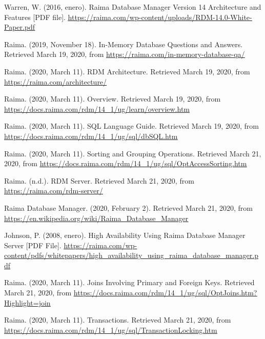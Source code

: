 \documentclass{acmart}
\begin{document}
\begin{thebibliography}{99}
     Warren, W. (2016, enero). Raima Database Manager Version 14 Architecture and Features [PDF file]. \href{https://raima.com/wp-content/uploads/RDM-14.0-White-Paper.pdf}{\ul{https://raima.com/wp-content/uploads/RDM-14.0-White-Paper.pdf}}\par
	 Raima. (2019, November 18). In-Memory Database Questions and Answers. Retrieved March 19, 2020, from \href{https://raima.com/in-memory-database-qa/}{\ul{https://raima.com/in-memory-database-qa/}} \par
	 Raima. (2020, March 11). RDM Architecture. Retrieved March 19, 2020, from \href{https://raima.com/architecture/}{\ul{https://raima.com/architecture/}} \par
	 Raima. (2020, March 11). Overview. Retrieved March 19, 2020, from \href{https://docs.raima.com/rdm/14_1/ug/learn/overview.htm}{\ul{https://docs.raima.com/rdm/14\_1/ug/learn/overview.htm}} \par
	 Raima. (2020, March 11). SQL Language Guide. Retrieved March 19, 2020, from \href{https://docs.raima.com/rdm/14_1/ug/sql/dbSQL.htm}{\ul{https://docs.raima.com/rdm/14\_1/ug/sql/dbSQL.htm}}\par
	 Raima. (2020, March 11). Sorting and Grouping Operations. Retrieved March 21, 2020, from \href{https://docs.raima.com/rdm/14_1/ug/sql/OptAccessSorting.htm}{\ul{https://docs.raima.com/rdm/14\_1/ug/sql/OptAccessSorting.htm}}\par
	 Raima. (n.d.). RDM Server. Retrieved March 21, 2020, from \href{https://raima.com/rdm-server/}{\ul{https://raima.com/rdm-server/}}\par
	 Raima Database Manager. (2020, February 2). Retrieved March 21, 2020, from \href{https://en.wikipedia.org/wiki/Raima_Database_Manager}{\ul{https://en.wikipedia.org/wiki/Raima\_Database\_Manager}}\par
	 Johnson, P. (2008, enero). High Availability Using Raima Database Manager Server [PDF File]. \href{https://raima.com/wp-content/pdfs/whitepapers/high_availability_using_raima_database_manager.pdf}{\ul{https://raima.com/wp-content/pdfs/whitepapers/high\_availability\_using\_raima\_database\_manager.pdf}}\par
	 Raima. (2020, March 11). Joins Involving Primary and Foreign Keys. Retrieved March 21, 2020, from \href{https://docs.raima.com/rdm/14_1/ug/sql/OptJoins.htm?Highlight=join}{\ul{https://docs.raima.com/rdm/14\_1/ug/sql/OptJoins.htm?Highlight=join}}\par
     Raima. (2020, March 11). Transactions. Retrieved March 21, 2020, from \href{https://docs.raima.com/rdm/14_1/ug/sql/TransactionLocking.htm}{\ul{https://docs.raima.com/rdm/14\_1/ug/sql/TransactionLocking.htm}}

\end{thebibliography}
\end{document}
